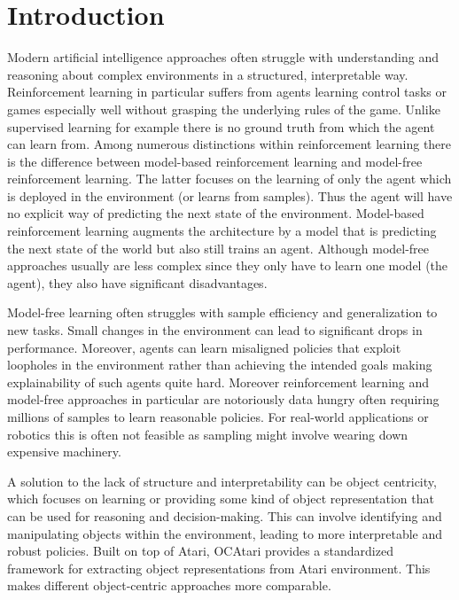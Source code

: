 \documentclass[
	english,
	ruledheaders=section,
	class=report,
	thesis={type=master},
	accentcolor=9c,
	custommargins=true,
	marginpar=false,
	parskip=half-,
	fontsize=11pt,
	pdfa=true,
]{tudapub}
\begin{document}
\chapter{Introduction}
\label{chap:introduction}

Modern artificial intelligence approaches often struggle with understanding and
reasoning about complex environments in a structured, interpretable way.
Reinforcement learning in particular suffers from agents learning control tasks
or games especially well without grasping the underlying rules of the game.
Unlike supervised learning for example there is no ground truth from which
the agent can learn from. Among numerous distinctions within reinforcement
learning there is the difference between model-based reinforcement learning and
model-free reinforcement learning. The latter focuses on the learning of only
the agent which is deployed in the environment (or learns from samples). Thus
the agent will have no explicit way of predicting the next state of the
environment. Model-based reinforcement learning augments the architecture by a
model that is predicting the next state of the world but also still trains an
agent. Although model-free approaches usually are less complex since they only
have to learn one model (the agent), they also have significant disadvantages.

Model-free learning often struggles with sample efficiency and generalization
to new tasks. Small changes in the environment can lead to significant drops in
performance. Moreover, agents can learn misaligned policies that exploit
loopholes in the environment rather than achieving the intended goals making
explainability of such agents quite hard. Moreover reinforcement learning and
model-free approaches in particular are notoriously data hungry often requiring
millions of samples to learn reasonable policies. For real-world applications
or robotics this is often not feasible as sampling might involve wearing down
expensive machinery.

A solution to the lack of structure and interpretability can be object
centricity, which focuses on learning or providing some kind of object
representation that can be used for reasoning and decision-making. This can
involve identifying and manipulating objects within the environment, leading to
more interpretable and robust policies. Built on top of Atari, OCAtari
\cite{DBLP:conf/rlc/DelfosseBGSK24} provides a standardized framework for extracting
object representations from Atari environment. This makes
different object-centric approaches more comparable.
\end{document}
